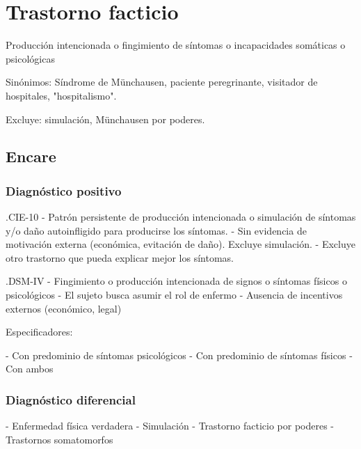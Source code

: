 \chapter{Trastorno facticio}
Producción intencionada o fingimiento de síntomas o incapacidades somáticas o psicológicas

Sinónimos: Síndrome de Münchausen, paciente peregrinante, visitador de hospitales, "hospitalismo".

Excluye: simulación, Münchausen por poderes.
\section*{Encare}

\subsection*{Diagnóstico positivo}
.CIE-10
- Patrón persistente de producción intencionada o simulación de síntomas y/o daño autoinfligido para producirse los síntomas.
- Sin evidencia de motivación externa (económica, evitación de daño). Excluye simulación.
- Excluye otro trastorno que pueda explicar mejor los síntomas.

.DSM-IV
- Fingimiento o producción intencionada de signos o síntomas físicos o psicológicos
- El sujeto busca asumir el rol de enfermo
- Ausencia de incentivos externos (económico, legal)

Especificadores:

- Con predominio de síntomas psicológicos
- Con predominio de síntomas físicos
- Con ambos

\subsection*{Diagnóstico diferencial}

- Enfermedad física verdadera
- Simulación
- Trastorno facticio por poderes
- Trastornos somatomorfos
